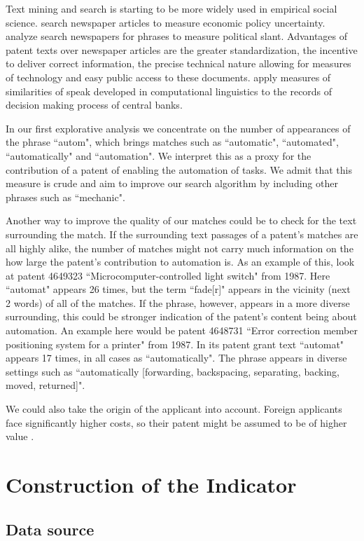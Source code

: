 \documentclass[11pt,a4paper]{article}
\begin{document}
Text mining and search is starting to be more widely used in empirical social science. \cite{BBD2013} search newspaper articles to measure economic policy uncertainty. \cite{GS2010} analyze search newspapers  for phrases to measure political slant. Advantages of patent texts over newspaper articles are the greater standardization, the incentive to deliver correct information, the precise technical nature allowing for measures of technology and easy public access to these documents. \cite{HMP2014} apply measures of similarities of speak developed in computational linguistics to the records of decision making process of central banks.

In our first explorative analysis we concentrate on the number of appearances of the phrase ``autom", which brings matches such as ``automatic", ``automated", ``automatically" and ``automation". We interpret this as a proxy for the contribution of a patent of enabling the automation of tasks. We admit that this measure is crude and aim to improve our search algorithm by including other phrases such as ``mechanic".

Another way to improve the quality of our matches could be to check for the text surrounding the match. If the surrounding text passages of a patent's matches are all highly alike, the number of matches might not carry much information on the how large the patent's contribution to automation is. As an example of this, look at patent  4649323 ``Microcomputer-controlled light switch" from 1987. Here ``automat" appears 26 times, but the term ``fade[r]" appears in the vicinity (next 2 words) of all of the matches. If the phrase, however, appears in a more diverse surrounding, this could be stronger indication of the patent's content being about automation. An example here would be patent 4648731 ``Error correction member positioning system for a printer" from 1987. In its patent grant text ``automat" appears 17 times, in all cases as ``automatically". The phrase appears in diverse settings such as ``automatically [forwarding, backspacing,  separating, backing, moved, returned]".

We could also take the origin of the applicant into account. Foreign applicants face significantly higher costs, so their patent might be assumed to be of higher value \citep{HS2005}.


\section{Construction of the Indicator}
\subsection{Data source}
\end{document}

